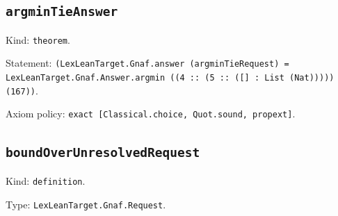\documentclass[11pt]{article}
\begin{document}
\subsection*{\texttt{argminTieAnswer}}
\noindent Kind: \texttt{theorem}.\par
\noindent Statement: \texttt{(LexLeanTarget.Gnaf.answer (argminTieRequest) = LexLeanTarget.Gnaf.Answer.argmin ((4 :: (5 :: ([] : List (Nat))))) (167))}.\par
\noindent Axiom policy: \texttt{exact [Classical.choice, Quot.sound, propext]}.\par
\subsection*{\texttt{boundOverUnresolvedRequest}}
\noindent Kind: \texttt{definition}.\par
\noindent Type: \texttt{LexLeanTarget.Gnaf.Request}.\par
\end{document}
